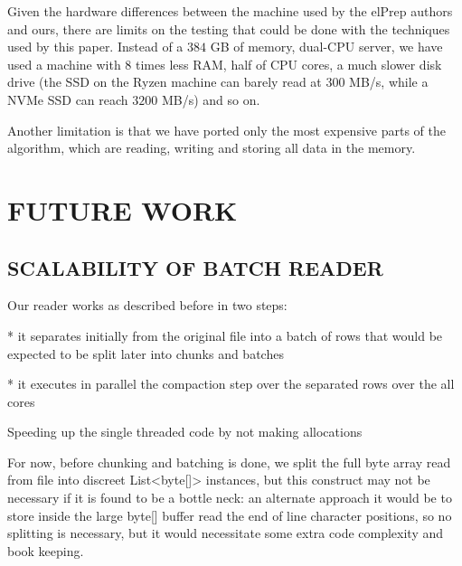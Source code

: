 \documentclass[a4paper,twoside]{article}
\begin{document}
Given the hardware differences between the machine used by the elPrep authors and ours, there are limits on the testing that could be done with the techniques used by this paper.
Instead of a $384$ GB of memory, dual-CPU server, we have used a machine  with $8$ times less RAM, half of CPU cores, a much slower disk drive (the SSD on the Ryzen machine can barely read at 300 MB/s, while a NVMe SSD can reach $3200$ MB/s) and so on.

Another limitation is that we have ported only the most expensive parts of the algorithm, which are reading,  writing and storing all data in the memory. 












\section{\uppercase{Future work}}\label{sec:uppercase}

\subsection{\uppercase{Scalability of batch reader}}\label{subsec:uppercase5}

Our reader works as described before in two steps:

* it separates initially from the original file into a batch of rows that would be expected to be split later into chunks and batches

* it executes in parallel the compaction step over the separated rows over the all cores

Speeding up the single threaded code by not making allocations

For now, before chunking and batching is done, we split the full byte array read from file into discreet List<byte[]> instances,
but this construct may not be necessary if it is found to be a bottle neck: an alternate approach it would be to store inside the large byte[]
buffer read the end of line character positions, so no splitting is necessary, but it would necessitate some extra code complexity and book keeping.
\end{document}
